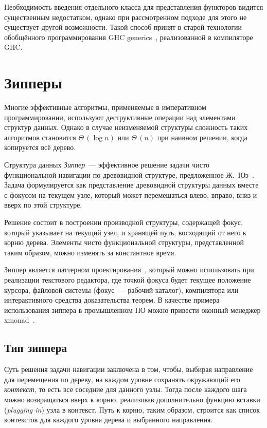 Необходимость введения отдельного класса для представления
функторов видится существенным недостатком, однако при
рассмотренном подходе для этого не существует другой возможности.
Такой способ принят в старой технологии обобщённого
программирования \textsf{GHC generics}~\cite{ghc-generics},
реализованной в компиляторе \textsf{GHC}.

\section{Зипперы}
\label{sec:zippers}

Многие эффективные алгоритмы, применяемые в императивном программировании, используют деструктивные операции над элементами структур данных. Однако в случае неизменяемой структуры сложность таких алгоритмов становится $\Theta\,(\log n)$ или $\Theta\,(n)$ при наивном решении, когда копируется всё дерево.

Структура данных \emph{Зиппер}~--- эффективное решение задачи чисто функциональной навигации по древовидной структуре, предложенное Ж.~Юэ~\cite{Hue1997}. Задача формулируется как представление древовидной структуры данных вместе с фокусом на текущем узле, который может перемещаться влево, вправо, вниз и вверх по этой структуре.

Решение состоит в построении производной структуры, содержащей фокус, который указывает на текущий узел, и хранящей путь, восходящий от него к корню дерева. Элементы чисто функциональной структуры, представленной таким образом, можно изменять за константное время.

Зиппер является паттерном проектирования~\cite{Ad2010}, который можно использовать при реализации текстового редактора, где точкой фокуса будет текущее положение курсора, файловой системы (фокус~--- рабочий каталог), компилятора или интерактивного средства доказательства теорем. В качестве примера использования зиппера в промышленном ПО можно привести оконный менеджер \textsf{xmonad}~\cite{xmonad}.

\subsection{Тип зиппера}

Суть решения задачи навигации заключена в том, чтобы, выбирая направление для перемещения по дереву, на каждом уровне сохранять окружающий его \emph{контекст}, то есть все соседние для данного узлы. Тогда после каждого шага можно возвращаться вверх к корню, реализовав дополнительно функцию вставки (\textsl{plugging in}) узла в контекст. Путь к корню, таким образом, строится как список контекстов для каждого уровня дерева и выбранного направления.

